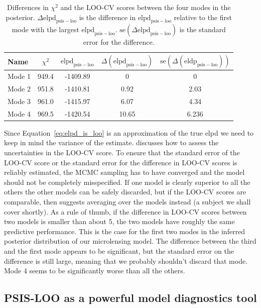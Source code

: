 \documentclass[12pt,dvipsnames]{report}
\begin{document}
\begin{table}[h!]
\centering
\begin{tabular}{l c c c c} 
 \toprule
Name & $\chi^2$ & $\mathrm{elpd}_\mathrm{psis-loo}$ & $\Delta(\mathrm{elpd}_\mathrm{psis-loo})$ & $\mathrm{se}(\Delta(\mathrm{eldp}_\mathrm{psis-loo}))$ \\
 \midrule
 Mode 1 & 949.4& -1409.89 & 0 & 0 \\
 Mode 2 & 951.8& -1410.81 & 0.92 & 2.03\\
 Mode 3 & 961.0& -1415.97 &  6.07 & 4.34\\
 Mode 4 & 969.5& -1420.54 &  10.65	& 6.236\\
\bottomrule
\end{tabular}
\caption{Differences in $\chi^2$ and the LOO-CV scores between the four modes in the 
posterior. $\Delta \mathrm{elpd}_\mathrm{psis-loo}$ is the difference in 
$\mathrm{elpd}_\mathrm{psis-loo}$ relative to the first mode with the largest 
$\mathrm{elpd}_\mathrm{psis-loo}$. $\mathrm{se}(\Delta \mathrm{elpd}_\mathrm{psis-loo})$
is the standard error for the difference.}
\label{tab:loo_cv}
\end{table}

Since Equation~\ref{eq:elpd_is_loo} is an approximation of the true elpd we need to 
keep in mind the variance of the estimate. \citet{arXiv:2008.10296} discusses how 
to assess the uncertainties in the LOO-CV score. To ensure that the standard 
error of the LOO-CV score or the standard error for the difference in LOO-CV scores is 
reliably estimated, the MCMC sampling has to have converged and the model should not be
completely misspecified. If one model is clearly superior to all the others 
the other models can be safely discarded, but if the LOO-CV scores are comparable,
then \citet{arXiv:2008.10296} suggests averaging over the models instead (a subject we
shall cover shortly).
As a rule of thumb, if the difference in LOO-CV scores between two models is smaller 
than about 5, the two models have roughly the same predictive performance.
This is the case for the first two modes in the inferred posterior distribution of our 
microlensing model. The difference between the third 
and the first mode appears to be significant, but the standard error on the difference 
is still large, meaning that we probably shouldn't discard that mode.
Mode 4 seems to be significantly worse than all the others.


\subsection{PSIS-LOO as a powerful model diagnostics tool}
\end{document}
